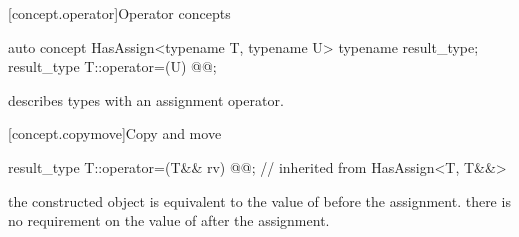 \documentclass[american]{book}
\begin{document}
\renewcommand{\sectionmark}[1]{\markright{\thesection\hspace{1em}#1}}
\renewcommand{\chaptermark}[1]{\markboth{#1}{}}
\begin{paras}
\setcounter{chapter}{20}
\setcounter{section}{1}
\setcounter{subsection}{2}
[concept.operator]{Operator concepts}

\setcounter{Paras}{27}
\begin{itemdecl}
auto concept HasAssign<typename T, typename U> {
  typename result_type;
  result_type T::operator=(U) @\added{\&}@;
}
\end{itemdecl}

\begin{itemdescr}
\pnum
\realnote describes types with an assignment operator.
\end{itemdescr}

\setcounter{subsection}{7}
[concept.copymove]{Copy and move}
\setcounter{Paras}{6}

\begin{itemdecl}
result_type T::operator=(T&& rv) @\added{\&}@; // inherited from HasAssign<T, T\&\&>
\end{itemdecl}

\begin{itemdescr}
\pnum
\postconditions
the constructed  object is equivalent to the value of
 before the assignment. 
\enternote there is no requirement on the value of
 after 
the assignment. \exitnote
\end{itemdescr}

\end{paras}
\end{document}
